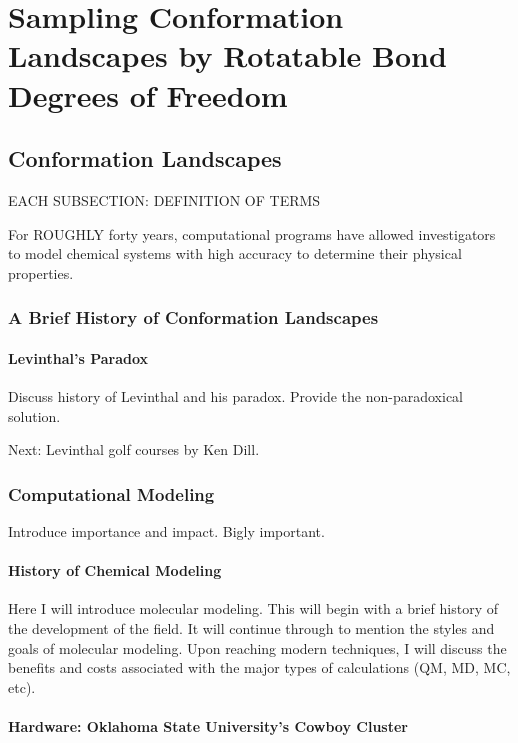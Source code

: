 \chapter{Sampling Conformation Landscapes by Rotatable Bond Degrees of Freedom}
\label{ch:ConformationLandscape}

\section{Conformation Landscapes}

EACH SUBSECTION: DEFINITION OF TERMS

For ROUGHLY forty years, computational programs have allowed investigators to model chemical systems with high accuracy to determine their physical properties.

\subsection{A Brief History of Conformation Landscapes}

\subsubsection{Levinthal's Paradox}

Discuss history of Levinthal and his paradox. Provide the non-paradoxical solution.

Next: Levinthal golf courses by Ken Dill.

\subsection{Computational Modeling}

Introduce importance and impact. Bigly important.

\subsubsection{History of Chemical Modeling}

Here I will introduce molecular modeling. This will begin with a brief history of the development of the field. It will continue through to mention the styles and goals of molecular modeling. Upon reaching modern techniques, I will discuss the benefits and costs associated with the major types of calculations (QM, MD, MC, etc). 

\subsubsection{Hardware: Oklahoma State University's Cowboy Cluster}

